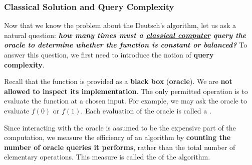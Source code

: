 \subsubsection{Classical Solution and Query Complexity}\label{ex:classical-solution-and-query-complexity}

Now that we know the problem about the Deutsch's algorithm, let us ask a natural question: \emph{\textbf{how many times must a \underline{classical computer} query the oracle to determine whether the function is constant or balanced?}} To answer this question, we first need to introduce the notion of \textbf{query complexity}.

\highspace
Recall that the function is provided as a \textbf{black box} (\textbf{oracle}). We are \textbf{not allowed to inspect its implementation}. The only permitted operation is to evaluate the function at a chosen input. For example, we may ask the oracle to evaluate $f(0)$ or $f(1)$. Each evaluation of the oracle is called a .

\highspace
Since interacting with the oracle is assumed to be the expensive part of the computation, we measure the efficiency of an algorithm by \textbf{counting the number of oracle queries it performs}, rather than the total number of elementary operations. This measure is called the  of the algorithm.

